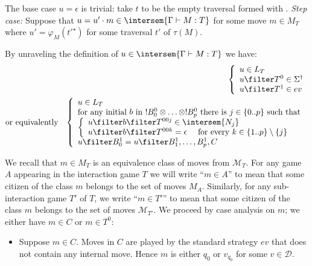 \begin{enumerate}[$\bullet$]
\begin{enumerate}
    The base case $u=\epsilon$ is trivial: take $t$ to be the empty traversal formed with .
    \emph{Step case:} Suppose that $u = u' \cdot m \in
    \intersem{\Gamma \vdash M : T}$ for some move $m \in
    M_T$ where $u' = \varphi_M(t'^\star)$ for some traversal
    $t'$ of $\tau(M)$.

    By unraveling the definition of $u \in \intersem{\Gamma \vdash M : T}$ we have:
    \begin{eqnarray*}
      &&      \left\{
            \begin{array}{ll}
                u \in L_T\\
                u \filter T^0  \in \Sigma^\dagger \\
                u \filter T^1  \in  ev
            \end{array}
            \right. \\
    & \mbox{or equivalently} & \left\{
    \begin{array}{ll}
        u \in L_T \\
        \hbox{for any initial $b$ in $!B_0^0 \otimes \ldots \otimes !B_p^0$ there is $j \in \{0..p\}$ such that } \\
        \left\{\begin{array}{ll}
            u \filter b \filter T^{00j} \in \intersem{N_j} \label{eq:def_z} \\
            u \filter b \filter T^{00k} = \epsilon \quad \mbox{ for every } k\in \{1..p\}\setminus\{j\} \label{eq:b}
        \end{array}
        \right. \\
        u \filter B^1_0 = u \filter B^1_1, \ldots, B^1_p, C
    \end{array}
    \right.
    \end{eqnarray*}

We recall that $m \in M_T$ is an equivalence class of moves
from $\mathcal{M}_T$. For any game $A$ appearing in the
interaction game $T$ we will write ``$m \in A$'' to mean
that some citizen of the class $m$ belongs to the set of
moves $M_A$. Similarly, for any sub-interaction game $T'$ of
$T$, we write ``$m \in T'$'' to mean that some citizen of
the class $m$ belongs to the set of moves
$\mathcal{M}_{T'}$. We proceed by case analysis on $m$; we either have $m\in C$ or $m\in T^0$:
    \begin{itemize}
    \item Suppose $m \in C$. Moves in $C$ are played by the standard strategy $ev$ that does not contain any internal move. Hence $m$ is either $q_0$ or $v_{q_0}$ for some $v\in\mathcal{D}$.


\end{itemize}
\end{enumerate}
\end{enumerate}
